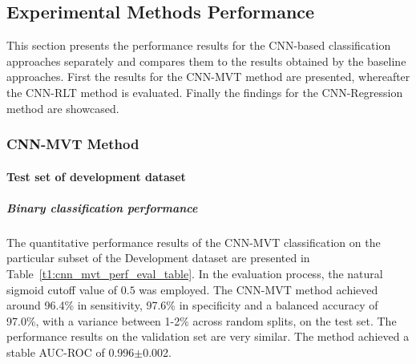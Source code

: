 \subsection{Experimental Methods Performance}
\label{subsec:exp_methods_perf}

This section presents the performance results for the CNN-based classification approaches separately and compares them 
to the results obtained by the baseline approaches.
First the results for the CNN-MVT method are presented, whereafter the CNN-RLT method is evaluated.
Finally the findings for the CNN-Regression method are showcased.

\subsubsection{CNN-MVT Method}
\label{subsubsec:eval_mvt}


\paragraph{Test set of development dataset}


\subparagraph{Binary classification performance}

The quantitative performance results of the CNN-MVT classification on the 
particular subset of the Development dataset are presented in Table~\ref{t1:cnn_mvt_perf_eval_table}.
In the evaluation process, the natural sigmoid cutoff value of $0.5$ was employed.
The CNN-MVT method achieved around 96.4\% in sensitivity, 97.6\% in specificity and a balanced accuracy of 97.0\%, 
with a variance between 1-2\% across random splits, on the test set.
The performance results on the validation set are very similar.
The method achieved a stable AUC-ROC of 0.996$\pm$0.002.


